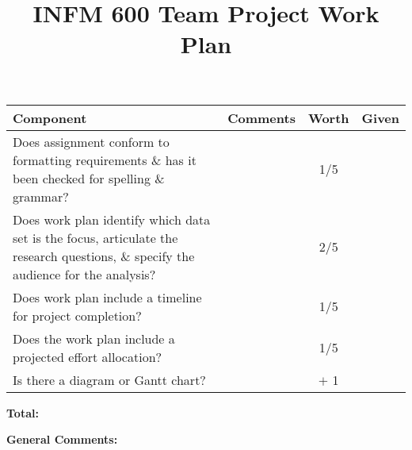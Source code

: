 \documentclass[12pt]{article}
\title{INFM 600 Team Project Work Plan}
\date{\vspace{-10ex}}%
\newcommand\tab[1][0.25cm]{\hspace*{#1}}
\begin{document}
	\maketitle
		\renewcommand{\arraystretch}{2}
		\begin{tabulary}{6.5in}{| p{2.75in} | p{2.5in} | c | c |}
			\hline
			\textbf{Component} & \textbf{Comments} & \textbf{Worth} & \textbf{Given}\\
			\hline
			Does assignment conform to formatting requirements \& has it been checked for spelling \& grammar?  & &  1/5 & \\
			\hline
			Does work plan identify which data set is the focus, articulate the research questions, \& specify the audience for the analysis? & &  2/5 & \\
			\hline
			Does work plan include a timeline for project completion? & &  1/5 & \\
			\hline
			Does the work plan include a projected effort allocation? & &  1/5 & \\
			\hline
			Is there a diagram or Gantt chart? & & $+$ 1 & \\
			\hline
		\end{tabulary}

\begin{flushright}
	\textbf{Total:}\tab[3.3cm]
\end{flushright}


	\textbf{General Comments:}

	
\end{document}
